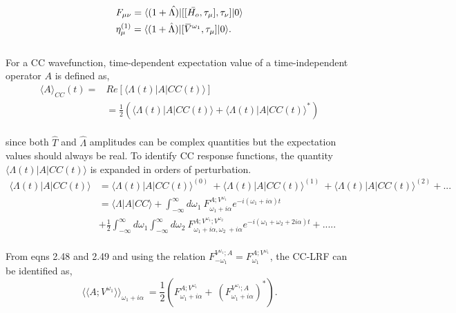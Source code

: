 \begin{equation}
\begin{split}
& F_{\mu\nu} = \bra{(1+ \hat{\Lambda)}}[[\bar{H_o}, \tau_\mu],\tau_\nu]\ket{0}\\
& \eta^{(1)}_{\mu} = \bra{(1+ \hat{\Lambda})}[\overbar{V}^{\omega_1}, \tau_\mu]\ket{0}.\\
\end{split}
\end{equation}
\\
For a CC wavefunction, time-dependent expectation value of a time-independent operator 
$A$ is defined as\cite{Pedersen97},
\\
\begin{equation}
\begin{split}
{\langle A \rangle}_{CC} (t) = & Re [\langle \Lambda(t) | A | CC(t)\rangle ]\\
& = \frac{1}{2} (\langle \Lambda(t) | A | CC(t)\rangle  + {\langle \Lambda(t) | A | CC(t)\rangle}^{*})
\end{split}
\end{equation}
\\
since both $\hat{T}$ and $\hat{\Lambda}$ amplitudes can be complex quantities but 
the expectation values should always be real. To identify CC response functions,  
the quantity $\langle \Lambda(t) | A | CC(t)\rangle$ is expanded in orders of 
perturbation\cite{Pedersen97}.
\\
\begin{equation}
\begin{split}
\langle \Lambda(t) | A | CC(t) \rangle & = {\langle \Lambda(t) | A | CC(t) \rangle}^{(0)}\
 + {\langle \Lambda(t) | A | CC(t) \rangle}^{(1)} \
+ {\langle \Lambda(t) | A | CC(t) \rangle}^{(2)} + ... \\
& = \langle \Lambda | A | CC \rangle + \int_{-\infty}^{\infty}d\omega_1 \
F^{A;V^{\omega_1}}_{\omega_1 + i\alpha}e^{-i(\omega_1 + i\alpha)t} \\
& + \frac{1}{2} \int_{-\infty}^{\infty}d\omega_1\int_{-\infty}^{\infty}d\omega_2\
F^{A;V^{\omega_1};V^{\omega_2}}_{\omega_1 + i\alpha,\omega_2 \
+ i\alpha}e^{-i(\omega_1 + \omega_2 + 2i\alpha)t} + .....
\end{split}
\end{equation}
\\
From eqns 2.48 and 2.49 and using the relation $F^{V^{\omega_1};A}_{-\omega_1}=F^{A;V^{\omega_1}}_{\omega_1}$, the CC-LRF can be identified as,
\\
\begin{equation}
{\langle\langle A;V^{\omega_1} \rangle\rangle}_{\omega_1 + i\alpha} \
= \frac{1}{2}( F^{A;V^{\omega_1}}_{\omega_1 + i\alpha} + \
(F^{V^{\omega_1};A}_{\omega_1 + i\alpha})^{*}).
\end{equation}
